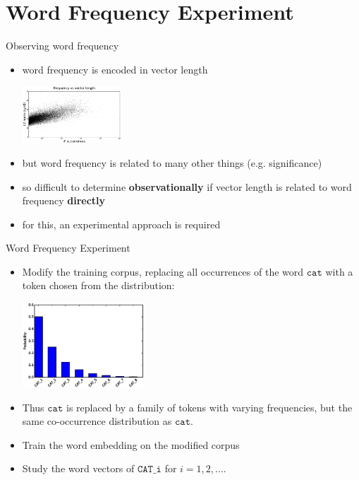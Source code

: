 \documentclass{beamer}
\newcommand{\word}[1]{\texttt{#1}}
\begin{document}
\section{Word Frequency Experiment}

\begin{frame}{Observing word frequency}
\begin{itemize}
	\item word frequency is encoded in vector length
		\begin{center}
		\includegraphics[height=80px]{frequency-norm-scatterplot} \\
		\end{center}
	\item but word frequency is related to many other things (e.g. significance)
	\item so difficult to determine \textbf{observationally} if vector length is related to word frequency \textbf{directly}
	\item for this, an experimental approach is required
\end{itemize}
\end{frame}

\begin{frame}{Word Frequency Experiment}
\begin{itemize}
	\item Modify the training corpus, replacing all occurrences of the word $\word{cat}$ with a token chosen from the distribution:
	\begin{center}
	\includegraphics[height=120px]{truncated-geometric-distribution} \\
	\end{center}
	\item Thus $\word{cat}$ is replaced by a family of tokens with varying frequencies, but the same co-occurrence distribution as $\word{cat}$.
	\item Train the word embedding on the modified corpus
	\item Study the word vectors of $\word{CAT\_i}$ for $i = 1, 2, \dots$.
\end{itemize}
\end{frame}
\end{document}
